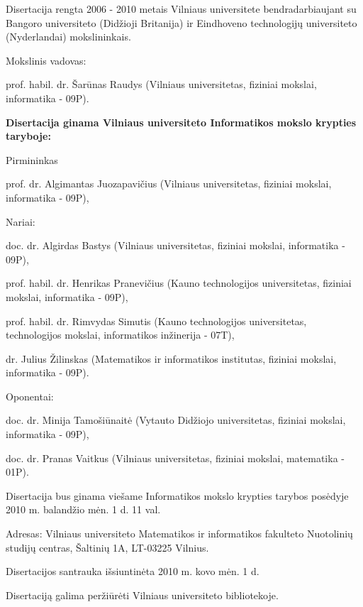 \begin{singlespace}
\noindent Disertacija rengta 2006 - 2010 metais Vilniaus universitete bendradarbiaujant su Bangoro universiteto (Didžioji Britanija) ir Eindhoveno technologijų universiteto (Nyderlandai) mokslininkais.

\vspace{1cm}

\noindent Mokslinis vadovas:
\vspace{0.5cm}

\begin{singlespace}
prof. habil. dr. Šarūnas Raudys (Vilniaus universitetas, fiziniai mokslai, informatika - 09P).
\end{singlespace}

\vspace{1cm}
	
\noindent\textbf{Disertacija ginama Vilniaus universiteto Informatikos mokslo krypties taryboje:}

\vspace{0.5cm}
	
\noindent Pirmininkas

prof. dr. Algimantas Juozapavičius (Vilniaus universitetas, fiziniai mokslai, informatika - 09P),

\noindent Nariai:

doc. dr. Algirdas Bastys (Vilniaus universitetas, fiziniai mokslai, informatika - 09P),

prof. habil. dr. Henrikas Pranevičius (Kauno technologijos universitetas, fiziniai mokslai, informatika - 09P),

prof. habil. dr. Rimvydas Simutis (Kauno technologijos universitetas, technologijos mokslai, informatikos inžinerija - 07T), 

dr. Julius Žilinskas (Matematikos ir informatikos institutas, fiziniai mokslai, informatika - 09P).

\vspace{1cm}

\noindent Oponentai:

doc. dr. Minija Tamošiūnaitė (Vytauto Didžiojo universitetas, fiziniai mokslai, informatika - 09P),

doc. dr. Pranas Vaitkus (Vilniaus universitetas, fiziniai mokslai, matematika - 01P).
\\


\vspace{1cm}
	
\noindent Disertacija bus ginama viešame Informatikos mokslo krypties tarybos posėdyje 2010 m. balandžio mėn. 1 d. 11 val. 

Adresas: Vilniaus universiteto Matematikos ir informatikos fakulteto Nuotolinių studijų centras, Šaltinių 1A, LT-03225 Vilnius.

\vspace{1cm}
\noindent Disertacijos santrauka išsiuntinėta 2010 m. kovo mėn. 1 d.

\noindent Disertaciją galima peržiūrėti Vilniaus universiteto bibliotekoje.
\end{singlespace}
	
